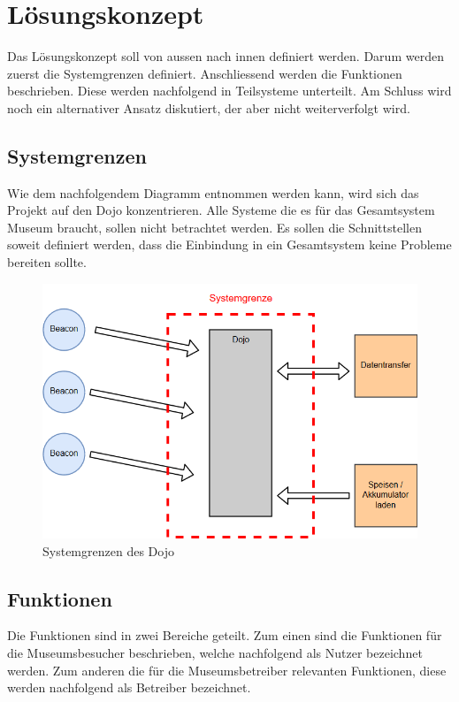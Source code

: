 \section{Lösungskonzept}
Das Lösungskonzept soll von aussen nach innen definiert werden. Darum werden zuerst die Systemgrenzen definiert. Anschliessend werden die Funktionen beschrieben. Diese werden nachfolgend in Teilsysteme unterteilt. Am Schluss wird noch ein alternativer Ansatz diskutiert, der aber nicht weiterverfolgt wird.

\subsection{Systemgrenzen}
Wie dem nachfolgendem Diagramm entnommen werden kann, wird sich das Projekt auf den Dojo konzentrieren. Alle Systeme die es für das Gesamtsystem Museum braucht, sollen nicht betrachtet werden. Es sollen die Schnittstellen soweit definiert werden, dass die Einbindung in ein Gesamtsystem keine Probleme bereiten sollte.

\begin{figure}[H]
\begin{center}
	\includegraphics[width=140mm]{data/Loesungskonzept_Systemgrenzen.png}
	\caption{Systemgrenzen des Dojo} %
	\label{fig:first_layer}
\end{center}
\end{figure}

\subsection{Funktionen}
Die Funktionen sind in zwei Bereiche geteilt. Zum einen sind die Funktionen für die Museumsbesucher beschrieben, welche nachfolgend als Nutzer bezeichnet werden. Zum anderen die für die Museumsbetreiber relevanten Funktionen, diese werden nachfolgend als Betreiber bezeichnet.
